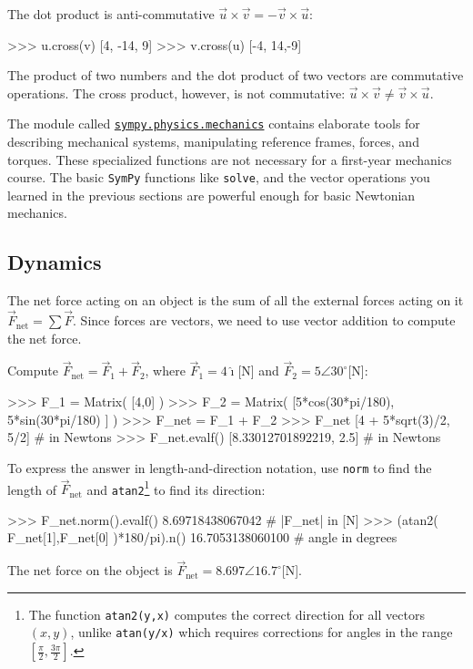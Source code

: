\noindent
The dot product is anti-commutative $\vec{u}\times\vec{v} = -\vec{v}\times\vec{u}$:
\small
\begin{verbatimtab}
>>> u.cross(v)
[4, -14, 9]
>>> v.cross(u)
[-4, 14,-9]
\end{verbatimtab}
\normalsize

\noindent
The product of two numbers and the dot product of two vectors are commutative operations.
The cross product, however, is not commutative: $\vec{u}\times\vec{v} \neq \vec{v}\times\vec{u}$.




\label{sec:sympytut_mechanics}

The module called \href{http://pyvideo.org/video/2653/dynamics-and-control-with-python}{\texttt{sympy.physics.mechanics}} 
contains elaborate tools for describing mechanical systems,
manipulating reference frames, forces, and torques.
These specialized functions are not necessary for a first-year mechanics course.
The basic \texttt{SymPy} functions like \texttt{solve},
and the vector operations you learned in the previous sections are powerful enough for basic Newtonian mechanics.

\subsection{Dynamics}
\label{mechanics:dynamics}

The net force acting on an object is the sum of all the external forces acting on it $\vec{F}_{\textrm{net}} = \sum \vec{F}$.
Since forces are vectors, 
we need to use vector addition to compute the net force.

Compute %
$\vec{F}_{\textrm{net}}=\vec{F}_1 + \vec{F}_2$,
where $\vec{F}_1=4\hat{\imath}$[N] and $\vec{F}_2 = 5\angle 30^\circ$[N]:
\small
\begin{verbatimtab}
>>> F_1 =  Matrix( [4,0] ) 
>>> F_2 =  Matrix( [5*cos(30*pi/180), 5*sin(30*pi/180) ] )
>>> F_net = F_1 + F_2
>>> F_net 
[4 + 5*sqrt(3)/2,   5/2]          # in Newtons 
>>> F_net.evalf()
[8.33012701892219,  2.5]          # in Newtons 
\end{verbatimtab}
\normalsize

\noindent
To express the answer in length-and-direction notation,
use \texttt{norm} to find the length of $\vec{F}_{\textrm{net}}$
and \texttt{atan2}\footnote{The function \texttt{atan2(y,x)} computes the correct direction 
for all vectors $(x,y)$, unlike \texttt{atan(y/x)} which requires corrections for angles in the range $[\frac{\pi}{2}, \frac{3\pi}{2}]$.}
to find its direction:
\small
\begin{verbatimtab}
>>> F_net.norm().evalf()
8.69718438067042                  # |F_net| in [N] 
>>> (atan2( F_net[1],F_net[0] )*180/pi).n()
16.7053138060100                  # angle in degrees
\end{verbatimtab}
\normalsize
The net force on the object is $\vec{F}_{\textrm{net}}= 8.697\angle 16.7^\circ$[N].


